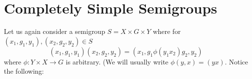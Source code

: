 
%
%

\section{Completely Simple Semigroups}
\label{2.2}


     Let us again consider a semigroup $S = X \times G \times Y$ where for
$(x_1,g_1,y_1),(x_2,g_2,y_2) \in S$
\[
     (x_1,g_1,y_1)(x_2,g_2,y_2) = (x_1,g_1 \phi(y_1x_2)g_2, y_2)
\]
 where $\phi: Y \times X \to G$ is arbitrary.  (We will usually write
$\phi(y,x) = (yx).$  Notice the following:
